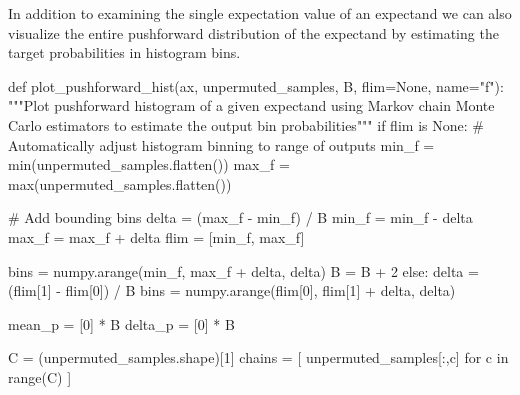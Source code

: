 \documentclass[
  letterpaper,
  DIV=11,
  numbers=noendperiod]{scrartcl}
\newenvironment{Shaded}{\begin{snugshade}}{\end{snugshade}}
\newcommand{\BuiltInTok}[1]{\textcolor[rgb]{0.00,0.23,0.31}{#1}}
\newcommand{\CommentTok}[1]{\textcolor[rgb]{0.37,0.37,0.37}{#1}}
\newcommand{\ControlFlowTok}[1]{\textcolor[rgb]{0.00,0.23,0.31}{#1}}
\newcommand{\DecValTok}[1]{\textcolor[rgb]{0.68,0.00,0.00}{#1}}
\newcommand{\KeywordTok}[1]{\textcolor[rgb]{0.00,0.23,0.31}{#1}}
\newcommand{\NormalTok}[1]{\textcolor[rgb]{0.00,0.23,0.31}{#1}}
\newcommand{\OperatorTok}[1]{\textcolor[rgb]{0.37,0.37,0.37}{#1}}
\newcommand{\StringTok}[1]{\textcolor[rgb]{0.13,0.47,0.30}{#1}}
\newcommand{\VariableTok}[1]{\textcolor[rgb]{0.07,0.07,0.07}{#1}}
\begin{document}
In addition to examining the single expectation value of an expectand we
can also visualize the entire pushforward distribution of the expectand
by estimating the target probabilities in histogram bins.

\begin{Shaded}
\begin{Highlighting}[]
\KeywordTok{def}\NormalTok{ plot\_pushforward\_hist(ax, unpermuted\_samples, B, flim}\OperatorTok{=}\VariableTok{None}\NormalTok{, name}\OperatorTok{=}\StringTok{"f"}\NormalTok{):}
  \CommentTok{"""Plot pushforward histogram of a given expectand using Markov chain}
\CommentTok{     Monte Carlo estimators to estimate the output bin probabilities"""}
  \ControlFlowTok{if}\NormalTok{ flim }\KeywordTok{is} \VariableTok{None}\NormalTok{:}
    \CommentTok{\# Automatically adjust histogram binning to range of outputs}
\NormalTok{    min\_f }\OperatorTok{=} \BuiltInTok{min}\NormalTok{(unpermuted\_samples.flatten())}
\NormalTok{    max\_f }\OperatorTok{=} \BuiltInTok{max}\NormalTok{(unpermuted\_samples.flatten())}
    
    \CommentTok{\# Add bounding bins}
\NormalTok{    delta }\OperatorTok{=}\NormalTok{ (max\_f }\OperatorTok{{-}}\NormalTok{ min\_f) }\OperatorTok{/}\NormalTok{ B}
\NormalTok{    min\_f }\OperatorTok{=}\NormalTok{ min\_f }\OperatorTok{{-}}\NormalTok{ delta}
\NormalTok{    max\_f }\OperatorTok{=}\NormalTok{ max\_f }\OperatorTok{+}\NormalTok{ delta}
\NormalTok{    flim }\OperatorTok{=}\NormalTok{ [min\_f, max\_f]}
    
\NormalTok{    bins }\OperatorTok{=}\NormalTok{ numpy.arange(min\_f, max\_f }\OperatorTok{+}\NormalTok{ delta, delta)}
\NormalTok{    B }\OperatorTok{=}\NormalTok{ B }\OperatorTok{+} \DecValTok{2}
  \ControlFlowTok{else}\NormalTok{:}
\NormalTok{    delta }\OperatorTok{=}\NormalTok{ (flim[}\DecValTok{1}\NormalTok{] }\OperatorTok{{-}}\NormalTok{ flim[}\DecValTok{0}\NormalTok{]) }\OperatorTok{/}\NormalTok{ B}
\NormalTok{    bins }\OperatorTok{=}\NormalTok{ numpy.arange(flim[}\DecValTok{0}\NormalTok{], flim[}\DecValTok{1}\NormalTok{] }\OperatorTok{+}\NormalTok{ delta, delta)}
  
\NormalTok{  mean\_p }\OperatorTok{=}\NormalTok{ [}\DecValTok{0}\NormalTok{] }\OperatorTok{*}\NormalTok{ B}
\NormalTok{  delta\_p }\OperatorTok{=}\NormalTok{ [}\DecValTok{0}\NormalTok{] }\OperatorTok{*}\NormalTok{ B}
  
\NormalTok{  C }\OperatorTok{=}\NormalTok{ (unpermuted\_samples.shape)[}\DecValTok{1}\NormalTok{]}
\NormalTok{  chains }\OperatorTok{=}\NormalTok{ [ unpermuted\_samples[:,c] }\ControlFlowTok{for}\NormalTok{ c }\KeywordTok{in} \BuiltInTok{range}\NormalTok{(C) ]}
  

\end{Highlighting}
\end{Shaded}
\end{document}
